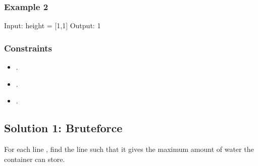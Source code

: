 \documentclass[letterpaper,12pt,english]{book}
\begin{document}
\subsubsection{Example 2}
\label{\detokenize{Two_Pointers/08_TP_11_Container_With_Most_Water:example-2}}
\begin{sphinxVerbatim}[commandchars=\\\{\}]
Input: height = [1,1]
Output: 1
\end{sphinxVerbatim}


\subsubsection{Constraints}
\label{\detokenize{Two_Pointers/08_TP_11_Container_With_Most_Water:constraints}}\begin{itemize}
\item {} 
\sphinxAtStartPar
{}.

\item {} 
\sphinxAtStartPar
{}.

\item {} 
\sphinxAtStartPar
{}.

\end{itemize}


\subsection{Solution 1: Bruteforce}
\label{\detokenize{Two_Pointers/08_TP_11_Container_With_Most_Water:solution-1-bruteforce}}
\sphinxAtStartPar
For each line , find the line  such that it gives the maximum amount of water the container  can store.
\end{document}
